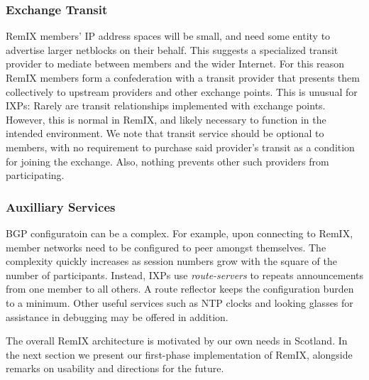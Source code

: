 \subsubsection{Exchange Transit}

RemIX members' IP address spaces will be small, and need some entity to
advertise larger netblocks on their behalf. This suggests a specialized transit
provider to mediate between members and the wider Internet. For this reason
RemIX members form a confederation with a transit provider that
presents them collectively to upstream providers and other exchange points. This
is unusual for \acp{IXP}: Rarely are transit relationships implemented with
exchange points. However, this is normal in RemIX, and likely necessary to
function in the intended environment. We note that transit service should be
optional to members, with no requirement to purchase said provider's transit as
a condition for joining the exchange. Also, nothing prevents other such
providers from participating.

\subsubsection{Auxilliary Services}

\acs{BGP} configuratoin can be a complex. For example, upon
connecting to RemIX, member networks need to be configured to peer amongst
themselves. The complexity quickly increases as session numbers grow with the
square of the number of participants. Instead, \acp{IXP} use
\emph{route-servers} to repeats announcements from one member to all others. A
route reflector keeps the configuration burden to a minimum. Other useful
services such as \acs{NTP} clocks and looking glasses for assistance in
debugging may be offered in addition.


The overall RemIX architecture is motivated by our own needs in Scotland. In
the next section we present our first-phase implementation of RemIX,
alongside remarks on usability and directions for the future.


